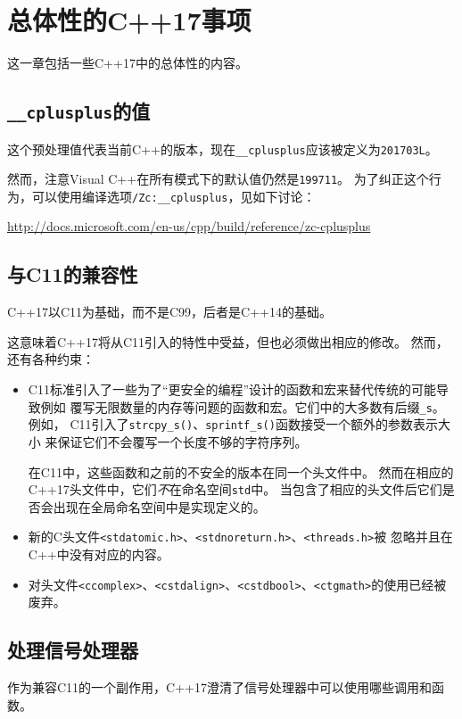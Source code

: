 \chapter{总体性的C++17事项}\label{ch34}
这一章包括一些C++17中的总体性的内容。


\section{\texttt{\_\_cplusplus}的值}
这个预处理值代表当前C++的版本，现在\texttt{\_\_cplusplus}应该被定义为\texttt{201703L}。

然而，注意Visual C++在所有模式下的默认值仍然是\texttt{199711}。
为了纠正这个行为，可以使用编译选项\texttt{/Zc:\_\_cplusplus}，见如下讨论：

\url{http://docs.microsoft.com/en-us/cpp/build/reference/zc-cplusplus}


\section{与C11的兼容性}
C++17以C11为基础，而不是C99，后者是C++14的基础。

这意味着C++17将从C11引入的特性中受益，但也必须做出相应的修改。
然而，还有各种约束：
\begin{itemize}
    \item C11标准引入了一些为了“更安全的编程”设计的函数和宏来替代传统的可能导致例如
    覆写无限数量的内存等问题的函数和宏。它们中的大多数有后缀\texttt{\_s}。例如，
    C11引入了\texttt{strcpy\_s()}、\texttt{sprintf\_s()}函数接受一个额外的参数表示大小
    来保证它们不会覆写一个长度不够的字符序列。

    在C11中，这些函数和之前的不安全的版本在同一个头文件中。
    然而在相应的C++17头文件中，它们\emph{不}在命名空间\texttt{std}中。
    当包含了相应的头文件后它们是否会出现在全局命名空间中是实现定义的。
    \item 新的C头文件\texttt{<stdatomic.h>}、\texttt{<stdnoreturn.h>}、\texttt{<threads.h>}被
    忽略并且在C++中没有对应的内容。
    \item 对头文件\texttt{<ccomplex>}、\texttt{<cstdalign>}、\texttt{<cstdbool>}、\texttt{<ctgmath>}的使用已经被废弃。
\end{itemize}


\section{处理信号处理器}
作为兼容C11的一个副作用，C++17澄清了信号处理器中可以使用哪些调用和函数。

